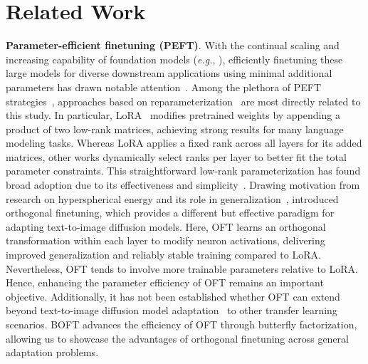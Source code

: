 \section{Related Work}

\textbf{Parameter-efficient finetuning (PEFT)}. With the continual scaling and increasing capability of foundation models (\emph{e.g.}, \cite{brown2020language,radford2021learning,rombach2022high,kirillov2023segment}), efficiently finetuning these large models for diverse downstream applications using minimal additional parameters has drawn notable attention~\cite{treviso2023efficient,ding2023parameter,lialin2023scaling}. Among the plethora of PEFT strategies~\cite{houlsby2019parameter,aghajanyan2020intrinsic,hulora2022,edalati2022krona,wang2022adamix,gheini2021cross,zaken2022bitfit,guo2020parameter,sung2021training,ansell2022composable,lester2021power,li2021prefix,vu2022spot,he2021towards,mao2021unipelt,karimi2021compacter,liu2022few,sung2022lst,chen2022parameter,jia2022visual,chen2022adaptformer,zhang2022neural,jie2023fact,lian2022scaling,luo2023towards}, approaches based on reparameterization~\cite{aghajanyan2020intrinsic,hulora2022,edalati2022krona} are most directly related to this study. In particular, LoRA~\cite{hulora2022} modifies pretrained weights by appending a product of two low-rank matrices, achieving strong results for many language modeling tasks. Whereas LoRA applies a fixed rank across all layers for its added matrices, other works \cite{zhang2022adaptive,valipour2022dylora,zhang2023increlora} dynamically select ranks per layer to better fit the total parameter constraints. This straightforward low-rank parameterization has found broad adoption due to its effectiveness and simplicity~\cite{dettmers2023qlora,zi2023delta,chavan2023one}. Drawing motivation from research on hyperspherical energy and its role in generalization~\cite{liu2018learning,liu2021orthogonal}, \cite{qiu2023controlling} introduced orthogonal finetuning, which provides a different but effective paradigm for adapting text-to-image diffusion models. Here, OFT learns an orthogonal transformation within each layer to modify neuron activations, delivering improved generalization and reliably stable training compared to LoRA. Nevertheless, OFT tends to involve more trainable parameters relative to LoRA. Hence, enhancing the parameter efficiency of OFT remains an important objective. Additionally, it has not been established whether OFT can extend beyond text-to-image diffusion model adaptation~\cite{qiu2023controlling} to other transfer learning scenarios. BOFT advances the efficiency of OFT through butterfly factorization, allowing us to showcase the advantages of orthogonal finetuning across general adaptation problems.

